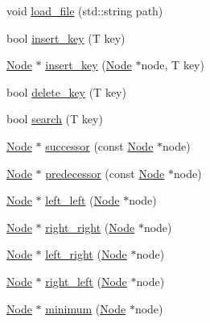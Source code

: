 \begin{DoxyCompactItemize}
\item 
void \hyperlink{classalgo_1_1_a_v_l_a539cc5cc606074a81f5e81a743db2ae2}{load\+\_\+file} (std\+::string path)
\item 
bool \hyperlink{classalgo_1_1_a_v_l_afc04af90c22d3c65b904efe58ba9cebd}{insert\+\_\+key} (T key)
\item 
\hyperlink{structalgo_1_1_a_v_l_1_1_node}{Node} $\ast$ \hyperlink{classalgo_1_1_a_v_l_adbd766a0c0e4904a6ce2fbc576dfe5d3}{insert\+\_\+key} (\hyperlink{structalgo_1_1_a_v_l_1_1_node}{Node} $\ast$node, T key)
\item 
bool \hyperlink{classalgo_1_1_a_v_l_ac276c566a3f90c704395e45d89bd9d8d}{delete\+\_\+key} (T key)
\item 
bool \hyperlink{classalgo_1_1_a_v_l_afb36fcddfc7b0dbbfeca1ab90b166997}{search} (T key)
\item 
\hyperlink{structalgo_1_1_a_v_l_1_1_node}{Node} $\ast$ \hyperlink{classalgo_1_1_a_v_l_a51fbd8745d249bbbe17c2f4bd2ad7b7d}{successor} (const \hyperlink{structalgo_1_1_a_v_l_1_1_node}{Node} $\ast$node)
\item 
\hyperlink{structalgo_1_1_a_v_l_1_1_node}{Node} $\ast$ \hyperlink{classalgo_1_1_a_v_l_a4a856d5763770a2504b27161467762e6}{predecessor} (const \hyperlink{structalgo_1_1_a_v_l_1_1_node}{Node} $\ast$node)
\item 
\hyperlink{structalgo_1_1_a_v_l_1_1_node}{Node} $\ast$ \hyperlink{classalgo_1_1_a_v_l_ac913fccd5993b7ba67280bb2f215549a}{left\+\_\+left} (\hyperlink{structalgo_1_1_a_v_l_1_1_node}{Node} $\ast$node)
\item 
\hyperlink{structalgo_1_1_a_v_l_1_1_node}{Node} $\ast$ \hyperlink{classalgo_1_1_a_v_l_aa74c017f8c6365d744427ec2e0cf0b10}{right\+\_\+right} (\hyperlink{structalgo_1_1_a_v_l_1_1_node}{Node} $\ast$node)
\item 
\hyperlink{structalgo_1_1_a_v_l_1_1_node}{Node} $\ast$ \hyperlink{classalgo_1_1_a_v_l_a680a6caabc7c13472ac4f6c3f5b30480}{left\+\_\+right} (\hyperlink{structalgo_1_1_a_v_l_1_1_node}{Node} $\ast$node)
\item 
\hyperlink{structalgo_1_1_a_v_l_1_1_node}{Node} $\ast$ \hyperlink{classalgo_1_1_a_v_l_a43ea63a3a8290720c8e73fa73314b5ac}{right\+\_\+left} (\hyperlink{structalgo_1_1_a_v_l_1_1_node}{Node} $\ast$node)
\item 
\hyperlink{structalgo_1_1_a_v_l_1_1_node}{Node} $\ast$ \hyperlink{classalgo_1_1_a_v_l_a2165bbf4dc551e536adee3d3018e9f20}{minimum} (\hyperlink{structalgo_1_1_a_v_l_1_1_node}{Node} $\ast$node)

\end{DoxyCompactItemize}

